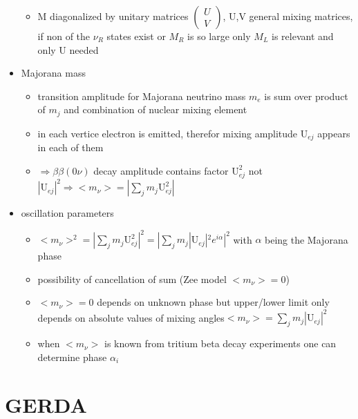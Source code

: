 \begin{itemize}
\begin{itemize}
\item M diagonalized by unitary matrices \(\begin{pmatrix} U \\ V \end{pmatrix}\), U,V general mixing matrices, if non of the \(\nu_R\) states exist or \(M_R\) is so large only \(M_L\) is relevant and only U needed
\end{itemize}
\item Majorana mass
\begin{itemize}
\item transition amplitude for Majorana neutrino mass \(m_e\) is sum over product of \(m_j\) and combination of nuclear mixing element
\item in each vertice electron is emitted, therefor mixing amplitude \(\mathrm{U}_{ej}\) appears in each of them
\item \(\Rightarrow \beta\beta(0\nu)\) decay amplitude contains factor \(\mathrm{U}_{ej}^2\) not \(|\mathrm{U}_{ej}|^2 \Rightarrow <m_\nu> = |\sum_jm_j\mathrm{U}_{ej}^2|\) 
\end{itemize}
\item oscillation parameters
\begin{itemize}
\item \(<m_\nu>^2 = |\sum_jm_j\mathrm{U}_{ej}^2|^2 = |\sum_jm_j|\mathrm{U}_{ej}|^2e^{i\alpha}|^2\) with \(\alpha\) being the Majorana phase
\item possibility of cancellation of sum (Zee model \(<m_\nu> = 0\))
\item \(<m_\nu> = 0\) depends on unknown phase but upper/lower limit only depends on absolute values of mixing angles\(<m_\nu> = \sum_jm_j|\mathrm{U}_{ej}|^2\)
\item when \(<m_\nu>\) is known from tritium beta decay experiments one can determine phase \(\alpha_i\)
\end{itemize}
\end{itemize}

 


\label{sec:Kry85}


\chapter{GERDA}
\label{sec:GERDA}

